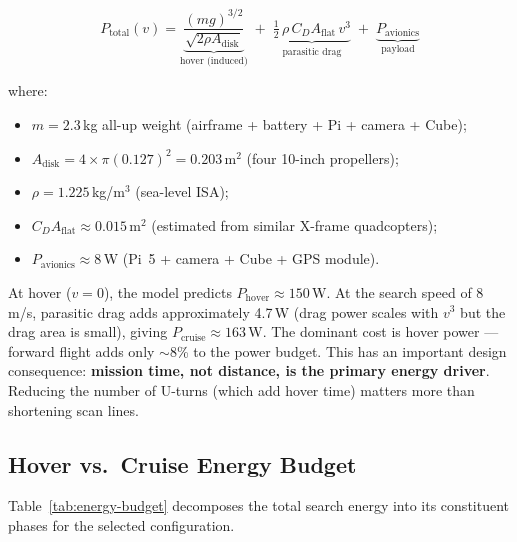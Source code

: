 \documentclass[10pt,a4paper]{article}
\begin{document}
\begin{equation}\label{eq:power-decomp}
  P_{\mathrm{total}}(v) = \underbrace{\frac{(mg)^{3/2}}{\sqrt{2 \rho A_{\mathrm{disk}}}}}_{\text{hover (induced)}} \;+\; \underbrace{\tfrac{1}{2}\,\rho\,C_D A_{\mathrm{flat}}\,v^3}_{\text{parasitic drag}} \;+\; \underbrace{P_{\mathrm{avionics}}}_{\text{payload}}
\end{equation}

\noindent where:
\begin{itemize}[nosep]
  \item $m = 2.3$\,kg all-up weight (airframe + battery + Pi + camera + Cube);
  \item $A_{\mathrm{disk}} = 4 \times \pi (0.127)^2 = 0.203$\,m$^2$ (four 10-inch propellers);
  \item $\rho = 1.225$\,kg/m$^3$ (sea-level ISA);
  \item $C_D A_{\mathrm{flat}} \approx 0.015$\,m$^2$ (estimated from similar X-frame quadcopters);
  \item $P_{\mathrm{avionics}} \approx 8$\,W (Pi~5 + camera + Cube + GPS module).
\end{itemize}

At hover ($v = 0$), the model predicts $P_{\mathrm{hover}} \approx 150$\,W. At the search speed of 8\,m/s, parasitic drag adds approximately 4.7\,W (drag power scales with $v^3$ but the drag area is small), giving $P_{\mathrm{cruise}} \approx 163$\,W. The dominant cost is hover power --- forward flight adds only $\sim$8\% to the power budget. This has an important design consequence: \textbf{mission time, not distance, is the primary energy driver}. Reducing the number of U-turns (which add hover time) matters more than shortening scan lines.

\subsection{Hover vs.\ Cruise Energy Budget}

Table~\ref{tab:energy-budget} decomposes the total search energy into its constituent phases for the selected configuration.
\end{document}

